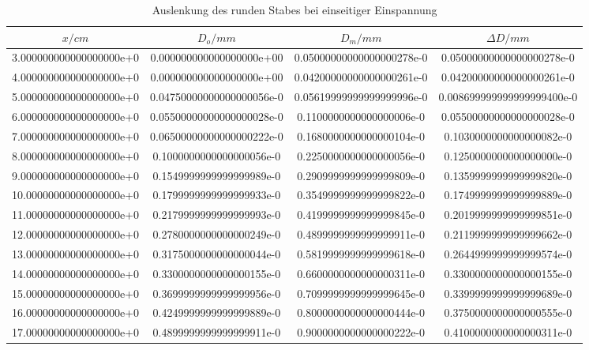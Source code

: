 \begin{table}
  \centering
  \caption{Auslenkung des runden Stabes bei einseitiger Einspannung}
  \label{tab:einseitig-r}
  \begin{tabular}{S S S S}
    \toprule
    {$x/cm$} & {$D_o/mm$} & {$D_m /mm$} & {$\Delta D /mm$}\\
    \midrule
    3.000000000000000000e+0 & 0.000000000000000000e+00 & 0.05000000000000000278e-0 & 0.05000000000000000278e-0\\
    4.000000000000000000e+0 & 0.000000000000000000e+00 & 0.04200000000000000261e-0 & 0.04200000000000000261e-0\\
    5.000000000000000000e+0 & 0.04750000000000000056e-0 & 0.05619999999999999996e-0 & 0.008699999999999999400e-0\\
    6.000000000000000000e+0 & 0.05500000000000000028e-0 & 0.1100000000000000006e-0 & 0.05500000000000000028e-0\\
    7.000000000000000000e+0 & 0.06500000000000000222e-0 & 0.1680000000000000104e-0 & 0.1030000000000000082e-0\\
    8.000000000000000000e+0 & 0.1000000000000000056e-0  & 0.2250000000000000056e-0 & 0.1250000000000000000e-0\\
    9.000000000000000000e+0 & 0.1549999999999999989e-0 & 0.2909999999999999809e-0 & 0.1359999999999999820e-0\\
    10.00000000000000000e+0 & 0.1799999999999999933e-0 & 0.3549999999999999822e-0 & 0.1749999999999999889e-0\\
    11.00000000000000000e+0 & 0.2179999999999999993e-0 & 0.4199999999999999845e-0 & 0.2019999999999999851e-0\\
    12.00000000000000000e+0 & 0.2780000000000000249e-0 & 0.4899999999999999911e-0 & 0.2119999999999999662e-0\\
    13.00000000000000000e+0 & 0.3175000000000000044e-0 & 0.5819999999999999618e-0 & 0.2644999999999999574e-0\\
    14.00000000000000000e+0 & 0.3300000000000000155e-0 & 0.6600000000000000311e-0 & 0.3300000000000000155e-0\\
    15.00000000000000000e+0 & 0.3699999999999999956e-0 & 0.7099999999999999645e-0 & 0.3399999999999999689e-0\\
    16.00000000000000000e+0 & 0.4249999999999999889e-0 & 0.8000000000000000444e-0 & 0.3750000000000000555e-0\\
    17.00000000000000000e+0 & 0.4899999999999999911e-0 & 0.9000000000000000222e-0 & 0.4100000000000000311e-0\\

\end{tabular}
\end{table}
